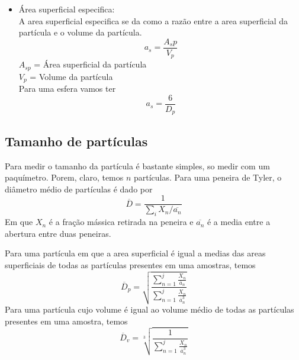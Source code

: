 \begin{itemize}
{        }
        \item { Área superficial especifica:\\
            A area superficial especifica se da como a razão entre a area superficial da partícula e
            o volume da partícula.\\
            \begin{equation}
                a_s=\frac{A_sp}{V_p}
            \end{equation}
            \(A_{sp}\) = Área superficial da partícula\\
            \(V_p\) = Volume da partícula\\
            Para uma esfera vamos ter
            \begin{equation}
                a_s=\frac{6}{D_p}
            \end{equation}
        }     
\end{itemize}
\subsection{Tamanho de partículas}
Para medir o tamanho da partícula é bastante simples, so medir com um paquímetro. Porem, claro,
temos \(n\) partículas. Para uma peneira de Tyler, o diâmetro médio de partículas é dado por
\begin{equation}
    \overline{D} = \frac{1}{\sum_i X_n/\overline{a_n}}
\end{equation}
Em que \(X_n\) é a fração mássica retirada na peneira e \(\overline{a_n}\) é a media entre a
abertura entre duas peneiras. \par Para uma partícula em que a area superficial é igual a medias das
areas superficiais de todas as partículas presentes em uma amostras, temos
\begin{equation}
    \overline{D}_p = \sqrt{\frac{\sum_{n= 1}^j \frac{X_n}{\overline{a}_n}}{\sum_{n= 1}^j \frac{X_n}{\overline{a}_n^3}}}
\end{equation}
Para uma partícula cujo volume é igual ao volume médio de todas as partículas presentes em uma
amostra, temos
\begin{equation}
    \overline{D}_v = \sqrt[3]{\frac{1}{\sum_{n= 1}^j \frac{X_n}{\overline{a}_n^3}}}
\end{equation}
